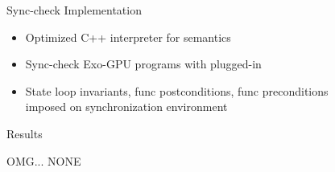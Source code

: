 \documentclass[aspectratio=169]{beamer}
\begin{document}
\begin{frame}[label=SyncCheckImplementation]{Sync-check Implementation}
\begin{itemize}
  \item Optimized C++ interpreter for  semantics
  \item Sync-check Exo-GPU programs with  plugged-in
\end{itemize}
\vphantom{Talk is cheap, show me the code!}
\begin{itemize}
  \item State loop invariants, func postconditions, func preconditions\\
        imposed on synchronization environment
\end{itemize}
\end{frame}

\begin{frame}[label=Results]{Results}

\Huge OMG... NONE

\end{frame}
\end{document}
